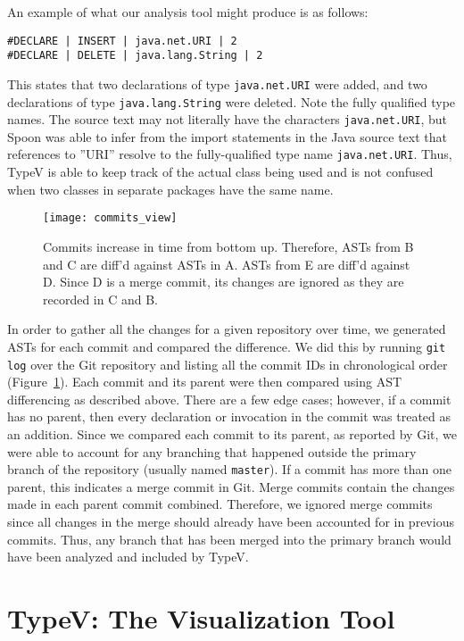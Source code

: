 An example of what our analysis tool might produce is as follows:

\begin{verbatim}
#DECLARE | INSERT | java.net.URI | 2
#DECLARE | DELETE | java.lang.String | 2
\end{verbatim}

This states that two declarations of type \texttt{java.net.URI} were added, and two declarations of type \texttt{java.lang.String} were deleted. Note the fully qualified type names. The source text may not literally have the characters \texttt{java.net.URI}, but Spoon was able to infer from the import statements in the Java source text that references to ''URI'' resolve to the fully-qualified type name \texttt{java.net.URI}. Thus, TypeV is able to keep track of the actual class being used and is not confused when two classes in separate packages have the same name.

\begin{figure}[!h]
\centering
\texttt{[image: commits\_view]}
\caption{Commits increase in time from bottom up. Therefore, ASTs from B and C are diff'd against ASTs in A. ASTs from E are diff'd against D. Since D is a merge commit, its changes are ignored as they are recorded in C and B.}
\label{fig:commits}
\end{figure}

In order to gather all the changes for a given repository over time, we generated ASTs for each commit and compared the difference. We did this by running \texttt{git log} over the Git repository and listing all the commit IDs in chronological order (Figure~\ref{fig:commits}). Each commit and its parent were then compared using AST differencing as described above. There are a few edge cases; however, if a commit has no parent, then every declaration or invocation in the commit was treated as an addition. Since we compared each commit to its parent, as reported by Git, we were able to account for any branching that happened outside the primary branch of the repository (usually named \texttt{master}). If a commit has more than one parent, this indicates a merge commit in Git. Merge commits contain the changes made in each parent commit combined. Therefore, we ignored merge commits since all changes in the merge should already have been accounted for in previous commits. Thus, any branch that has been merged into the primary branch would have been analyzed and included by TypeV.

\section{TypeV: The Visualization Tool}

